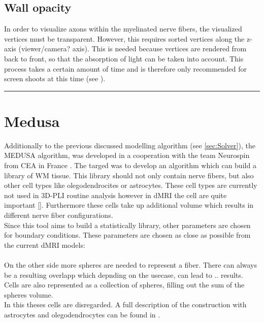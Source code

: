 \subsection{Wall opacity}
% 
In order to visualize axons within the myelinated nerve fibers, the visualized vertices must be transparent.
However, this requires sorted vertices along the z-axis (viewer/camera? axis).
This is needed because vertices are rendered from back to front, so that the absorption of light can be taken into account.
This process takes a certain amount of time and is therefore only recommended for screen shoots at this time (see \dummy{}).
% 
% 
\vspace{5pt}
\hrule
\vspace{6pt}
% 
\newpage
% 
\section{Medusa}
% 
% 
Additionally to the previous discussed modelling algorithm (see \cref{sec:Solver}), the \ac{MEDUSA} algorithm, was developed in a cooperation with the team Neurospin from \ac{CEA} in France \cite{Ginsburger2019}. The targed was to develop an algorithm which can build a library of \ac{WM} tissue. This library should not only contain nerve fibers, but also other cell types like olegodendrocites or astrocytes. These cell types are currently not used in \ac{3D-PLI} routine analysis however in \ac{dMRI} the cell are quite important [\dummy{}]. Furthermore these cells take up additional volume which results in different nerve fiber configurations.\\
% 
Since this tool aims to build a statistically library, other parameters are chosen for boundary conditions. These parameters are chosen as close as possible from the current \ac{dMRI} models:
\dummy{}\\
\dummy{}\\
% 
% 
On the other side more spheres are needed to represent a fiber. There can always be a resulting overlapp which depnding on the usecase, can lead to .. results.\\
% 
Cells are also represented as a collection of spheres, filling out the sum of the spheres volume. \\
%
In this theses cells are disregarded. A full description of the construction with astrocytes and olegodendrocytes can be found in \cite{Ginsburger2019}.
% 
